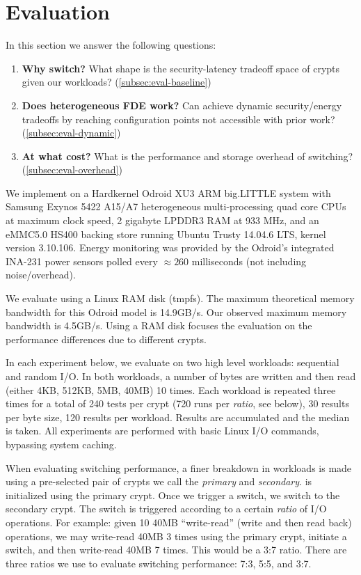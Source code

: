 \section{Evaluation}\label{sec:eval}

In this section we answer the following questions:

\begin{enumerate}
  \item {\bf Why switch?} What shape is the security-latency tradeoff space of
  crypts given our workloads? (\cref{subsec:eval-baseline})
  \item {\bf Does heterogeneous FDE work?} Can \sys achieve dynamic
  security/energy tradeoffs by reaching configuration points not accessible with
  prior work? (\cref{subsec:eval-dynamic})
  \item {\bf At what cost?} What is the performance and storage overhead of
  switching? (\cref{subsec:eval-overhead})
\end{enumerate}

 We implement \sys on a Hardkernel Odroid XU3 ARM
big.LITTLE system with Samsung Exynos 5422 A15/A7 heterogeneous multi-processing
quad core CPUs at maximum clock speed, 2 gigabyte LPDDR3 RAM at 933 MHz, and an
eMMC5.0 HS400 backing store running Ubuntu Trusty 14.04.6 LTS, kernel version
3.10.106. Energy monitoring was provided by the Odroid's integrated INA-231
power sensors polled every $\approx{260}$ milliseconds (not including
noise/overhead).

We evaluate \sys using a Linux RAM disk (tmpfs). The maximum theoretical memory
bandwidth for this Odroid model is 14.9GB/s\@. Our observed maximum memory
bandwidth is 4.5GB/s. Using a RAM disk focuses the evaluation on the performance
differences due to different crypts.

 In each experiment below, we evaluate \sys on two high
level workloads: sequential and random I/O. In both workloads, a number of bytes
are written and then read (either 4KB, 512KB, 5MB, 40MB) 10 times. Each workload
is repeated three times for a total of 240 tests per crypt (720 runs per {\em
ratio}, see below), 30 results per byte size, 120 results per workload. Results
are accumulated and the median is taken. All experiments are performed with
basic Linux I/O commands, bypassing system caching.

When evaluating switching performance, a finer breakdown in workloads is made
using a pre-selected pair of crypts we call the {\em primary} and {\em
secondary}. \sys is initialized using the primary crypt. Once we trigger a
switch, we switch to the secondary crypt. The switch is triggered according to a
certain {\em ratio} of I/O operations. For example: given 10 40MB ``write-read''
(write and then read back) operations, we may write-read 40MB 3 times using the
primary crypt, initiate a switch, and then write-read 40MB 7 times. This would
be a 3:7 ratio. There are three ratios we use to evaluate switching performance:
7:3, 5:5, and 3:7.


